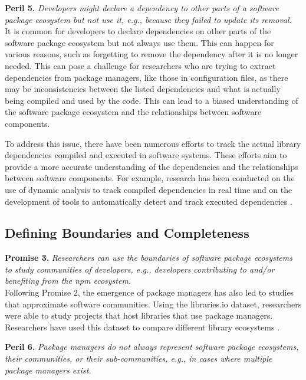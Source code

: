 \smallskip\noindent\textbf{Peril 5.}\textit{
Developers might declare a dependency to other parts of a software package ecosystem but not use it, e.g., because they failed to update its removal.
}\\

It is common for developers to declare dependencies on other parts of the software package ecosystem but not always use them. This can happen for various reasons, such as forgetting to remove the dependency after it is no longer needed. This can pose a challenge for researchers who are trying to extract dependencies from package managers, like those in configuration files, as there may be inconsistencies between the listed dependencies and what is actually being compiled and used by the code. This can lead to a biased understanding of the software package ecosystem and the relationships between software components.

To address this issue, there have been numerous efforts to track the actual library dependencies compiled and executed in software systems. These efforts aim to provide a more accurate understanding of the dependencies and the relationships between software components. For example, research has been conducted on the use of dynamic analysis to track compiled dependencies in real time and on the development of tools to automatically detect and track executed dependencies \cite{Zapata:ICSME2018, Ponta2018,Chinthanet:ASE2020}.

\subsection{Defining Boundaries and Completeness}

\smallskip\noindent\textbf{Promise 3.}\textit{
Researchers can use the boundaries of software package ecosystems to study communities of developers, e.g., developers contributing to and/or benefiting from the npm ecosystem.
}\\

Following Promise 2, the emergence of package managers has also led to studies that approximate software communities.
Using the libraries.io dataset, researchers were able to study projects that host libraries that use package managers.
Researchers have used this dataset to compare different library ecosystems \cite{kikas.2017,decan:emse:2019,CogoDown2019}.


\smallskip\noindent\textbf{Peril 6.}\textit{
Package managers do not always represent software package ecosystems, their communities, or their sub-communities, e.g., in cases where multiple package managers exist.
}\\

